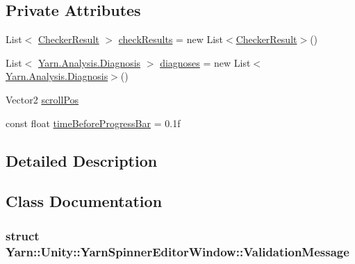 \subsection*{Private Attributes}
\begin{DoxyCompactItemize}
\item 
List$<$ \hyperlink{a00029}{Checker\-Result} $>$ \hyperlink{a00162_aa85ab7bd194e5425b991b9c216d4d10e}{check\-Results} = new List$<$\hyperlink{a00029}{Checker\-Result}$>$()
\item 
List$<$ \hyperlink{a00071}{Yarn.\-Analysis.\-Diagnosis} $>$ \hyperlink{a00162_a25c92cbfdd09661a96714d05b14af886}{diagnoses} = new List$<$\hyperlink{a00071}{Yarn.\-Analysis.\-Diagnosis}$>$()
\item 
Vector2 \hyperlink{a00162_a2d9b9702b0980af9d4202aebd440124b}{scroll\-Pos}
\item 
const float \hyperlink{a00162_a62a14b3fbaf2da41154ebad0eb7b6d3f}{time\-Before\-Progress\-Bar} = 0.\-1f
\end{DoxyCompactItemize}


\subsection{Detailed Description}


\subsection{Class Documentation}
\label{d4/d8f/a00324}
\hypertarget{a00162_d4/d8f/a00324}{}
\subsubsection{struct Yarn\-:\-:Unity\-:\-:Yarn\-Spinner\-Editor\-Window\-:\-:Validation\-Message}


